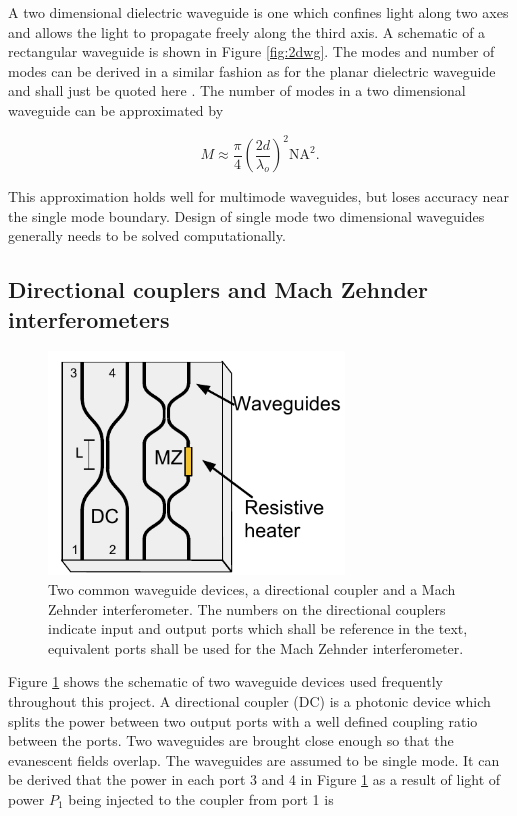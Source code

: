 A two dimensional dielectric waveguide is one which confines light along two
axes and allows the light to propagate freely along the third axis. A schematic
of a rectangular waveguide is shown in Figure \ref{fig:2dwg}. The modes and
number of modes can be derived in a similar fashion as for the planar dielectric
waveguide and shall just be quoted here \cite{saleh1991fundamentals}. The number
of modes in a two dimensional waveguide can be approximated by

\begin{equation} M \approx \frac{\pi}{4} \left( \frac{2d}{\lambda_o } \right)^2
\mathrm{NA}^2. \end{equation}

This approximation holds well for multimode waveguides, but loses accuracy near
the single mode boundary. Design of single mode two dimensional waveguides
generally needs to be solved computationally.

\subsection{Directional couplers and Mach Zehnder interferometers}

\begin{figure}[h!] \begin{center}
\includegraphics[width=0.7\textwidth]{images/wg_devices.pdf} \end{center}
\caption{Two common waveguide devices, a directional coupler and a Mach Zehnder
interferometer. The numbers on the directional couplers indicate input and
output ports which shall be reference in the text, equivalent ports shall be
used for the Mach Zehnder interferometer.} \label{fig:wg_devices} \end{figure}

Figure \ref{fig:wg_devices} shows the schematic of two waveguide devices used
frequently throughout this project. A directional coupler (DC) is a photonic
device which splits the power between two output ports with a well defined
coupling ratio between the ports. Two waveguides are brought close enough so
that the evanescent fields overlap. The waveguides are assumed to be single
mode. It can be derived that the power in each port 3 and 4 in Figure
\ref{fig:wg_devices} as a result of light of power $P_1$ being injected to the
coupler from port 1 is

